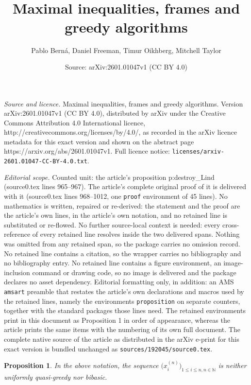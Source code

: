\documentclass[10pt,a4paper]{amsart}
\title{Maximal inequalities, frames and greedy algorithms}
\author{Pablo Bern\'a, Daniel Freeman, Timur Oikhberg, Mitchell Taylor}
\date{Source: arXiv:2601.01047v1 (CC BY 4.0)}
\newtheorem{proposition}{Proposition}
\def\N{{\mathbb N}}
\begin{document}
\maketitle

\noindent\emph{Source and licence.} Maximal inequalities, frames and greedy algorithms. Version arXiv:2601.01047v1 (CC BY 4.0), distributed by arXiv under the Creative Commons Attribution 4.0 International licence, http://creativecommons.org/licenses/by/4.0/, as recorded in the arXiv licence metadata for this exact version and shown on the abstract page https://arxiv.org/abs/2601.01047v1. Full licence notice: \texttt{licenses/arxiv-2601.01047-CC-BY-4.0.txt}.\par\smallskip

\noindent\textit{Editorial scope.} Counted unit: the article's proposition p:destroy\_Lind (source0.tex lines 965--967). The article's complete original proof of it is delivered with it (source0.tex lines 968--1012, one \texttt{proof} environment of 45 lines). No mathematics is written, repaired or re-derived: the statement and the proof are the article's own lines, in the article's own notation, and no retained line is substituted or re-flowed.  No further source-local context is needed: every cross-reference of every retained line resolves inside the two delivered spans.  Nothing was omitted from any retained span, so the package carries no omission record.  No retained line contains a citation, so the wrapper carries no bibliography and no bibliography entry.  No retained line contains a figure environment, an image-inclusion command or drawing code, so no image is delivered and the package declares no asset dependency.  Editorial formatting only, in addition: an AMS \texttt{amsart} preamble that restates the article's own declarations and macros used by the retained lines, namely the environments \texttt{proposition} on separate counters, together with the standard packages those lines need.  The retained environments print in this document as Proposition 1 in order of appearance, whereas the article prints the same items with the numbering of its own full document.  The complete native source of the article as distributed in the arXiv e-print for this exact version is bundled unchanged as \texttt{sources/192045/source0.tex}.
\begin{proposition}\label{p:destroy_Lind}
 In the above notation, the sequence $\big(x_i^{(n)}\big)_{1 \leq i \leq n, n \in \N}$ is neither uniformly quasi-greedy nor bibasic.
\end{proposition}
\end{document}
